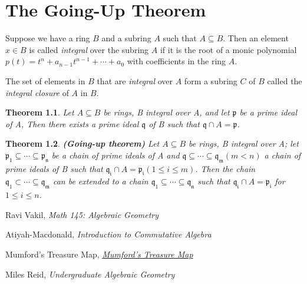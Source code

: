 \documentclass[]{report}
\newtheorem{theorem}{Theorem}[section]
\begin{document}
\chapter{The Going-Up Theorem}

Suppose we have a ring $B$ and a subring $A$ such that $A \subseteq B$. Then an element $x \in B$ is called \textit{integral} over the subring $A$ if it is the root of a monic polynomial $p(t) = t^n + a_{n-1}t^{n-1} + \cdots + a_0$ with coefficients in the ring $A$.

The set of elements in $B$ that are \textit{integral} over $A$ form a subring $C$ of $B$ called the \textit{integral closure} of $A$ in $B$.

\begin{theorem}
    Let $A\subseteq B$ be rings, B integral over A, and let $\mathfrak{p}$ be a prime ideal of A, Then there exists a prime ideal $\mathfrak{q}$ of B such that $\mathfrak{q}\cap A = \mathfrak{p}$. 
\end{theorem}

\begin{theorem}
    \textbf{(Going-up theorem)} Let $A \subseteq B$ be rings, B integral over A; let $\mathfrak{p_1 \subseteq \cdots \subseteq p_n}$ be a chain of prime ideals of A and $\mathfrak{q \subseteq \cdots \subseteq q_m} (m < n )$ a chain of prime ideals of B such that $\mathfrak{q_i} \cap A = \mathfrak{p_i} (1 \leq i \leq m)$. Then the chain $\mathfrak{q_1 \subset \cdots \subseteq q_m}$ can be extended to a chain $\mathfrak{q_1 \subseteq \cdots \subseteq q_n}$ such that $\mathfrak{q_i} \cap A = \mathfrak{p_i}$ for $1 \leq i \leq n$.
\end{theorem}

\begin{thebibliography}{9}

    Ravi Vakil,
    \textit{Math 145: Algebraic Geometry}

    Atiyah-Macdonald, 
    \textit{Introduction to Commutative Algebra}

    Mumford's Treasure Map,
    \href{https://web.archive.org/web/20201130150255/http://www.neverendingbooks.org/mumfords-treasure-map}{\textit{Mumford's Treasure Map}}

    Miles Reid,
    \textit{Undergraduate Algebraic Geometry}
\end{thebibliography}
\end{document}
